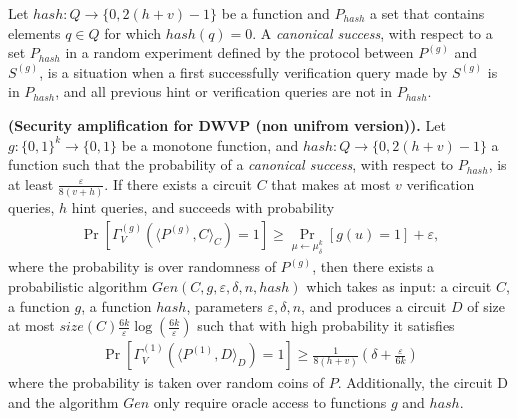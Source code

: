 Let $hash : Q \rightarrow \{0, 2(h+v)-1 \}$ be a function and $P_{hash}$ a set that contains elements $q \in Q$ for which $hash(q) = 0$.
A \textit{canonical success}, with respect to a set $P_{hash}$ in
a random experiment defined by the protocol between $P^{(g)}$ and $S^{(g)}$,
is a situation when a first successfully verification query made by $S^{(g)}$ is in $P_{hash}$,
and all previous hint or verification queries are not in $P_{hash}$.
%
%
\begin{theorem} {\textbf{(Security amplification for DWVP (non unifrom version)).}}
  Let $g: \{0,1\}^k \rightarrow \{0,1\}$ be a monotone function, and $hash:Q \rightarrow \{0,2(h+v)-1\}$ a function such that
  the probability of a \textit{canonical success}, with respect to $P_{hash}$, is at least $\frac{\varepsilon}{8\left(v + h\right)}$.
  If there exists a circuit $C$ that makes at most $v$ verification queries, $h$ hint queries,
  and succeeds with probability
  \begin{align}
    \Pr_{}[\Gamma_{V}^{(g)}( \langle P^{(g)},C \rangle_C ) = 1] \geq \Pr_{\mu \leftarrow \mu_{\delta}^{k}}[g(u) = 1] + \varepsilon ,
  \end{align}
  where the probability is over randomness of $P^{(g)}$,
  then there exists a probabilistic algorithm $Gen(C, g, \varepsilon, \delta, n, hash)$ which takes as input: a circuit $C$, a function $g$, a function $hash$,
  parameters $\varepsilon, \delta, n$, and produces a circuit $D$ of size at most $ size(C) \frac{6k}{\varepsilon} \log(\frac{6k}{\varepsilon}) $
  such that with high probability it satisfies
  \begin{align}
    \Pr_{}[\Gamma_V^{(1)} \left( \langle P^{(1)} ,D \rangle_D \right) = 1] \geq \frac{1}{8(h+v)} \left( \delta + \frac{\varepsilon}{6k} \right)
  \end{align}
  where the probability is taken over random coins of $P$.
  Additionally, the circuit D and the algorithm $Gen$ only require oracle access to functions $g$ and $hash$.
\end{theorem}


